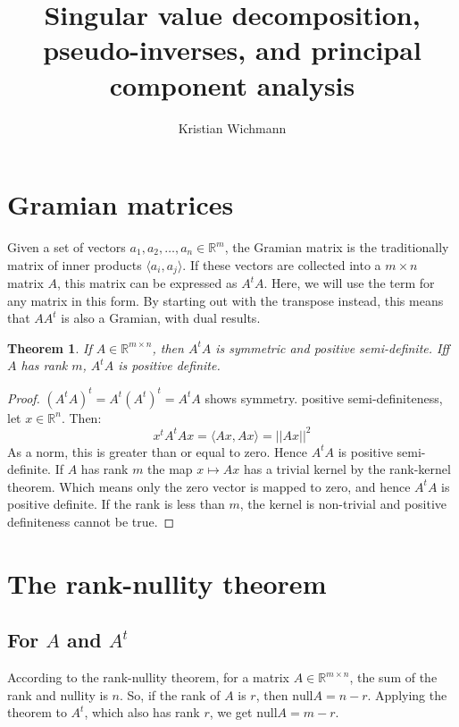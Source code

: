 \documentclass[12pt, a4paper]{article}
\title{Singular value decomposition, pseudo-inverses, and principal component analysis}
\author{Kristian Wichmann}
\newtheorem{theorem}{Theorem}[section]
\numberwithin{equation}{section}
\begin{document}
\maketitle

\section{Gramian matrices}
Given a set of vectors $a_1, a_2,\ldots, a_n\in\mathbb{R}^m$, the Gramian matrix is the traditionally matrix of inner products $\langle a_i,a_j\rangle$. If these vectors are collected into a $m\times  n$ matrix $A$, this matrix can be expressed as $A^t A$. Here, we will use the term for any matrix in this form. By starting out with the transpose instead, this means that $AA^t$ is also a Gramian, with dual results.

\begin{theorem}
\label{gramian_basic}
If $A\in\mathbb{R}^{m\times n}$, then $A^t A$ is symmetric and positive semi-definite. Iff $A$ has rank $m$, $A^t A$ is positive definite.
\end{theorem}
\begin{proof}
$(A^t A)^t=A^t(A^t)^t=A^t A$ shows symmetry. positive semi-definiteness, let $x\in\mathbb{R}^n$. Then:
\begin{equation}
x^t A^t Ax=\langle Ax,Ax\rangle=||Ax||^2
\end{equation}
As a norm, this is greater than or equal to zero. Hence $A^t A$ is positive semi-definite. If $A$ has rank $m$ the map $x\mapsto Ax$ has a trivial kernel by the rank-kernel theorem. Which means only the zero vector is mapped to zero, and hence $A^t A$ is positive definite. If the rank is less than $m$, the kernel is non-trivial and positive definiteness cannot be true.
\end{proof}

\section{The rank-nullity theorem}

\subsection{For $A$ and $A^t$}
According to the rank-nullity theorem, for a matrix $A\in\mathbb{R}^{m\times n}$, the sum of the rank and nullity is $n$. So, if the rank of $A$ is $r$, then $\textrm{null}A=n-r$. Applying the theorem to $A^t$, which also has rank $r$, we get $\textrm{null}A=m-r$.
\end{document}
